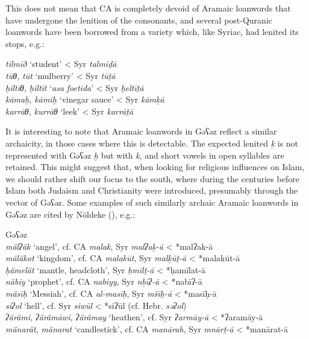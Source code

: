 \documentclass[output=paper]{langsci/langscibook}
\begin{document}
This does not mean that CA is completely devoid of Aramaic loanwords that have undergone the lenition of the consonants, and several post-Quranic loanwords have been borrowed from a variety which, like Syriac, had lenited its stops, e.g.:

\ea
\ea\textit{tilmīð} ‘student’ < Syr \textit{talmīḏā}  \citep[254]{Fraenkel1886}\\
\ex\textit{tūθ,} \textit{tūt} ‘mulberry’ < Syr \textit{tūṯā}  \citep[140]{Fraenkel1886}\\
\ex\textit{ḥiltīθ,} \textit{ḥiltīt} ‘\textit{asa} \textit{foetida}’ < Syr \textit{ḥeltīṯā} \citep[140]{Fraenkel1886}\\
\ex\textit{kāmaḫ,} \textit{kāmiḫ} ‘vinegar sauce’ < Syr \textit{kāmḵā} \citep[288]{Fraenkel1886}\\
\ex\textit{karrāθ,} \textit{kurrāθ} ‘leek’ < Syr \textit{karrāṯā} \citep[144]{Fraenkel1886}
\z
\z

It is interesting to note that Aramaic loanwords in Gəʕəz reflect a similar archaicity, in those cases where this is detectable. The expected lenited \textit{ḵ} is not represented with Gəʕəz \textit{ḫ} but with \textit{k}, and short vowels in open syllables are retained. This might suggest that, when looking for religious influences on Islam, we should rather shift our focus to the south, where during the centuries before Islam both Judaism and Christianity were introduced, presumably through the vector of Gəʕəz. Some examples of such similarly archaic Aramaic loanwords in Gəʕəz are cited by Nöldeke (\citeyear[31--46]{Nöldeke1910}), e.g.:

\ea Gəʕəz\\
\ea \textit{mälʔäk} ‘angel’, cf. CA \textit{malak}, Syr \textit{malʔaḵ-ā} < *malʔak-ā\\
\ex \textit{mäläkot} ‘kingdom’, cf. CA \textit{malakūt}, Syr \textit{malḵūṯ-ā} < *malakūt-ā\\
\ex \textit{ḥämelät} ‘mantle, headcloth’, Syr \textit{ḥmīlṯ-ā} < *ḥamīlat-ā\\
\ex \textit{näbīy} ‘prophet’, cf. CA \textit{nabiyy}, Syr \textit{nḇīʔ{}-ā} < *nabīʔ-ā\\
\ex \textit{mäsīḥ} ‘Messiah’, cf. CA \textit{al-masīḥ}, Syr \textit{mšīḥ-ā} < *masīḥ-ā\\
\ex \textit{siʔol} ‘hell’, cf. Syr \textit{siwūl} < *siʔūl (cf. Hebr. \textit{səʔol})\\
\ex \textit{ʔärämi,} \textit{ʔärämāwi,} \textit{ʔärämay} ‘heathen’, cf. Syr \textit{ʔarmāy-ā} < *ʔaramāy-ā\\
\ex \textit{mänarät,} \textit{mänarat} ‘candlestick’, cf. CA \textit{manārah}, Syr \textit{mnārṯ-ā} < *manārat-ā
\z
\z
\end{document}
